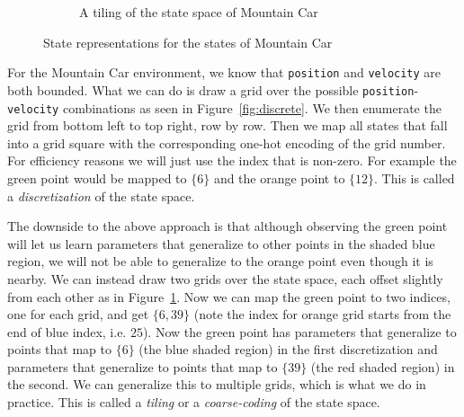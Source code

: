 \documentclass[11pt,addpoints,answers]{exam}
\begin{document}
\begin{figure}[H]
\begin{subfigure}{0.5\textwidth}
\caption{A tiling of the state space of Mountain Car}
\label{fig:tiling}
\end{subfigure}

\caption{State representations for the states of Mountain Car}
\label{fig:states}
\end{figure}

For the Mountain Car environment, we know that \texttt{position} and \texttt{velocity} are both bounded. What we can do is draw a grid over the possible \texttt{position}-\texttt{velocity} combinations as seen in Figure~\ref{fig:discrete}. We then enumerate the grid from bottom left to top right, row by row. Then we map all states that fall into a grid square with the corresponding one-hot encoding of the grid number. For efficiency reasons we will just use the index that is non-zero. For example the green point would be mapped to $\{6\}$ and the orange point to $\{12\}$. This is called a \emph{discretization} of the state space.

The downside to the above approach is that although observing the green point will let us learn parameters that generalize to other points in the shaded blue region, we will not be able to generalize to the orange point even though it is nearby. We can instead draw two grids over the state space, each offset slightly from each other as in Figure~\ref{fig:tiling}. Now we can map the green point to two indices, one for each grid, and get $\{6, 39\}$ (note the index for orange grid starts from the end of blue index, i.e. $25$). Now the green point has parameters that generalize to points that map to $\{6\}$ (the blue shaded region) in the first discretization and parameters that generalize to points that map to $\{39\}$ (the red shaded region) in the second. We can generalize this to multiple grids, which is what we do in practice. This is called a \emph{tiling} or a \emph{coarse-coding} of the state space. 
\end{document}
